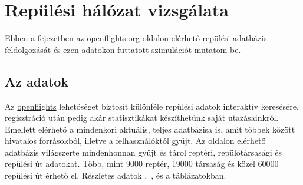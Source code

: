 \chapter{Repülési hálózat vizsgálata}\label{test}

Ebben a fejezetben az \href{http://openflights.org/}{openflights.org} oldalon elérhető repülési adatbázis feldolgozását és ezen adatokon futtatott szimulációt mutatom be.

  \section{Az adatok}
  Az \href{http://openflights.org/}{openflights} lehetőséget biztosít különféle repülési adatok interaktív keresésére, regisztráció után pedig akár statisztikákat készíthetünk saját utazásainkról. Emellett elérhető a mindenkori aktuális, teljes adatbázisa is, amit többek között hivatalos forrásokból, illetve a felhasználóktól gyűjt.
  Az oldalon elérhető adatbázis világszerte mindenhonnan gyűjt és tárol reptéri, repülőtársasági és repülési út adatokat. Több, mint 9000 reptér, 19000 társaság és közel 60000 repülési út érhető el. Részletes adatok ,~, és a  táblázatokban.

